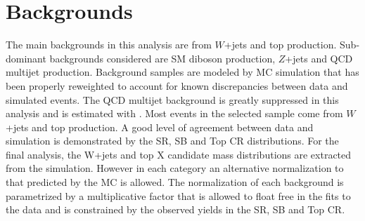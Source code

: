 \section{Backgrounds}
The main backgrounds in this analysis are from $W$+jets and top production. Sub-dominant
backgrounds considered are SM diboson production, $Z$+jets and QCD multijet production.
Background samples are modeled by MC simulation that has been properly reweighted to
account for known discrepancies between data and simulated events.
The QCD multijet background is greatly suppressed in this analysis and is estimated with \PYTHIA.
Most events in the selected sample come from $W$+jets and top production. 
A good level of agreement between data and simulation is demonstrated by the SR, SB and Top CR distributions.
For the final analysis, the W+jets and top X candidate mass distributions  are extracted from the simulation. 
However in each category an alternative normalization to that predicted by the MC is allowed. 
The normalization of each background is parametrized by a
multiplicative factor that is allowed to float free in the fits to the data and is constrained by the
observed yields in the SR, SB and Top CR.

